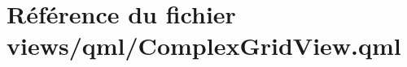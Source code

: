 \hypertarget{ComplexGridView_8qml}{\section{Référence du fichier views/qml/\-Complex\-Grid\-View.qml}
\label{ComplexGridView_8qml}
}
